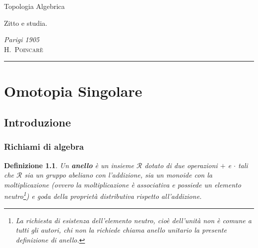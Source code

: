 \documentclass[10pt, twoside=false, x11names]{scrbook}
\newtheorem{definition}[theorem]{Definizione}
\newcommand{\R}{\mathcal{R}}
\begin{document}
\begin{titlepage}

\noindent
\titlefont Topologia Algebrica
\epigraph{Zitto e studia.}%
{\textit{Parigi 1905}\\ \textsc{H.\ Poincarè}}
\null\vfill
\vspace*{1cm}
\noindent
\hfill
\begin{minipage}{0.35\linewidth}
    \begin{flushright}
        \printauthor
    \end{flushright}
\end{minipage}
%
\begin{minipage}{0.02\linewidth}
    \rule{1pt}{125pt}
\end{minipage}
\titlepagedecoration
\end{titlepage}

\tableofcontents
\printsymblist



\chapter{Omotopia Singolare}

\section{Introduzione}

\subsection{Richiami di algebra}

\newmathsymb{R}{\R}{Anello}
\begin{definition}
  Un \textbf{anello}  è un insieme $ \R $ dotato di due operazioni $ + $ e $ \cdot $ tali che
  $ \R $ sia un gruppo abeliano con l'addizione, sia un monoide con la moltiplicazione
  (ovvero la moltiplicazione è associativa e possiede un elemento neutro\footnote{La richiesta
    di esistenza dell'elemento neutro, cioè dell'unità non è comune a tutti gli autori,
    chi non la richiede chiama anello unitario  la presente
    definizione di anello.}) e goda della proprietà distributiva rispetto all'addizione.
\end{definition}
\end{document}
